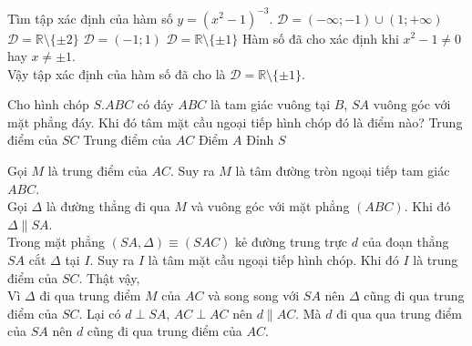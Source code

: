 \begin{ex}%
 Tìm tập xác định của hàm số $y = (x^2-1)^{-3}$.
 \choice
  {$\mathscr{D} = (-\infty;-1) \cup (1;+\infty)$}
  {$\mathscr{D} = \mathbb{R} \setminus \{ \pm 2 \}$}
  {$\mathscr{D} = (-1;1)$}
  {\True $\mathscr{D} = \mathbb{R} \setminus \{ \pm 1 \}$}
 \loigiai
  {
  Hàm số đã cho xác định khi $x^2 - 1 \neq 0$ hay $x \neq \pm 1$.\\
  Vậy tập xác định của hàm số đã cho là $\mathscr{D} = \mathbb{R} \setminus \{ \pm 1 \}$.
  }
\end{ex}

\begin{ex}%
 Cho hình chóp $S.ABC$ có đáy $ABC$ là tam giác vuông tại $B$, $SA$ vuông góc với mặt phẳng đáy. Khi đó tâm mặt cầu ngoại tiếp hình chóp đó là điểm nào?
 \choice
  {\True Trung điểm của $SC$}
  {Trung điểm của $AC$}
  {Điểm $A$}
  {Đỉnh $S$}
 \loigiai
  {
  \immini
  {
  Gọi $M$ là trung điểm của $AC$. Suy ra $M$ là tâm đường tròn ngoại tiếp tam giác $ABC$.\\
  Gọi $\Delta$ là đường thẳng đi qua $M$ và vuông góc với mặt phẳng $(ABC)$. Khi đó $\Delta \parallel SA$.\\
  Trong mặt phẳng $(SA,\Delta) \equiv (SAC)$ kẻ đường trung trực $d$ của đoạn thẳng $SA$ cắt $\Delta$ tại $I$. Suy ra $I$ là tâm mặt cầu ngoại tiếp hình chóp. Khi đó $I$ là trung điểm của $SC$. Thật vậy,\\
  Vì $\Delta$ đi qua trung điểm $M$ của $AC$ và song song với $SA$ nên $\Delta$ cũng đi qua trung điểm của $SC$.
  Lại có $d \perp SA$, $AC \perp AC$ nên $d \parallel AC$. Mà $d$ đi qua qua trung điểm của $SA$ nên $d$ cũng đi qua trung điểm của $AC$.
  }
  {
  }
  }
\end{ex}

